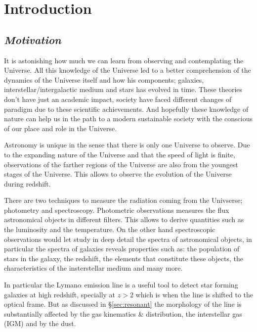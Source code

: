 
\chapter{Introduction} %

\label{sec:intro} %


\section{\emph{Motivation}}

It is astonishing how much we can learn from observing and 
contemplating the Universe. All this knowledge of the Universe
led to a better comprehension of the dynamics of the Universe itself 
and how his components; galaxies, interstellar/intergalactic
medium and stars has evolved in time. These theories don't have
just an academic impact, society have faced different changes of 
paradigm due to these scientific achievements. And hopefully these
knowledge of nature can help us in the path to a modern 
sustainable society with the conscious of our place and role 
in the Universe.  

Astronomy is unique in the sense that there is only one Universe 
to observe. Due to the expanding nature of the Universe and 
that the speed of light is finite, observations of the farther 
regions of the Universe are also from the youngest stages of the Universe.
This allows to observe the evolution of the Universe during redshift.

There are two techniques to measure the radiation coming from the 
Univserse; photometry and spectroscopy. Photometric observations measures 
the flux astronomical objects in different filters. This allows to derive quantities such as the luminosity and the temperature. On the other hand spectroscopic observations would let study in deep detail
the spectra of astronomical objects, in particular the spectra of 
galaxies reveals properties such as: the population of stars in the galaxy, the
redshift, the elements that constitute these objects, the characteristics 
of the insterstellar medium and many more.

In particular the Lyman$\alpha$ emission line is a useful 
tool to detect star forming galaxies at high redshift, specially 
at $z>2$ which is when the line is shifted to the optical frame. But 
as discussed in \S\ref{sec:resonant} the morphology of the line 
is substantially affected
by the gas kinematics \& distribution, the interstellar gas (IGM)
 and by the dust. 

